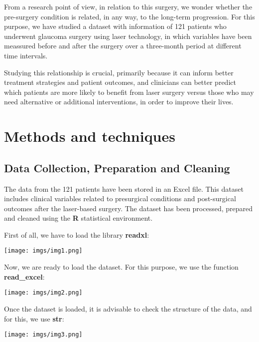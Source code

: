 \documentclass{article}
\begin{document}
From a research point of view, in relation to this surgery, we wonder whether the pre-surgery condition is related, 
in any way, to the long-term progression. 
For this purpose, we have studied a dataset with information of 121 patients who underwent glaucoma surgery 
using laser technology, in which variables have been meassured before and after the surgery over a three-month 
period at different time intervals.

Studying this relationship is crucial, primarily because it can inform better treatment strategies and patient 
outcomes, and clinicians can better predict which patients are more likely to benefit from laser surgery versus 
those who may need alternative or additional interventions, in order to improve their lives.


\section{Methods and techniques}

\subsection{Data Collection, Preparation and Cleaning}

The data from the 121 patients have been stored in an Excel file. This dataset includes clinical variables
related to presurgical conditions and post-surgical outcomes after the laser-based surgery.
The dataset has been processed, prepared and cleaned using the \textbf{R} statistical environment.

First of all, we have to load the library \textbf{readxl}:

\begin{center}
    {\texttt{[image: imgs/img1.png]}\par}
\end{center}


Now, we are ready to load the dataset. For this purpose, we use the function \textbf{read\_excel}:

\begin{center}
    {\texttt{[image: imgs/img2.png]}\par}
\end{center}


Once the dataset is loaded, it is advisable to check the structure of the data, and for this, we
use \textbf{str}:

\begin{center}
    {\texttt{[image: imgs/img3.png]}\par}
\end{center}
\end{document}
